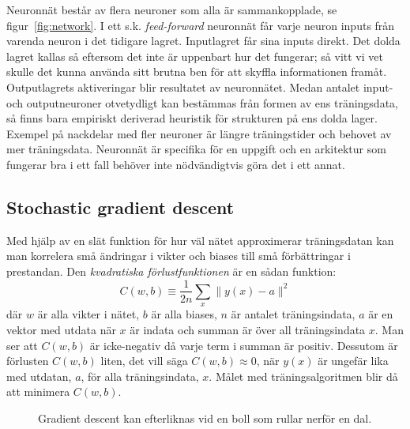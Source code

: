 Neuronnät består av flera neuroner som alla är sammankopplade, se figur~\ref{fig:network}.
I ett s.k. \textit{feed-forward} neuronnät får varje neuron inputs från
varenda neuron i det tidigare lagret.
Inputlagret får sina inputs direkt.
Det dolda lagret kallas så eftersom det inte är uppenbart hur det fungerar;
så vitt vi vet skulle det kunna använda sitt brutna ben
för att skyffla informationen framåt.
Outputlagrets aktiveringar blir resultatet av neuronnätet.
Medan antalet input- och outputneuroner otvetydligt kan bestämmas
från formen av ens träningsdata,
så finns bara empiriskt deriverad heuristik för strukturen på ens dolda lager.
Exempel på nackdelar med fler neuroner är längre träningstider
och behovet av mer träningsdata.
Neuronnät är specifika för en uppgift och en arkitektur som
fungerar bra i ett fall behöver inte nödvändigtvis göra det i ett annat.
\autocite{nielsen15}

\subsection{Stochastic gradient descent}
Med hjälp av en slät funktion för hur väl nätet approximerar träningsdatan
kan man korrelera små ändringar i vikter och biases
till små förbättringar i prestandan.
Den \emph{kvadratiska förlustfunktionen} är en sådan funktion:
\begin{equation} \label{eq:cost}
	C(w, b) \equiv \frac{1}{2n} \displaystyle\sum_x \lVert y(x) - a \rVert^2
\end{equation}
där $ w $ är alla vikter i nätet, $ b $ är alla biases,
$ n $ är antalet träningsindata, $ a $ är en vektor med utdata när $ x $ är indata
och summan är över all träningsindata $ x $.
Man ser att $ C(w, b) $ är icke-negativ då varje term i summan är positiv.
Dessutom är förlusten $ C(w, b) $ liten, det vill säga $ C(w, b) \approx 0 $,
när $ y(x) $ är ungefär lika med utdatan, $ a $, för alla träningsindata, $ x $.
Målet med träningsalgoritmen blir då att minimera $ C(w, b) $.

\begin{figure}
	\centering
	\caption{Gradient descent kan efterliknas vid en boll som rullar nerför en dal.}
	\label{fig:descent}
\end{figure}

